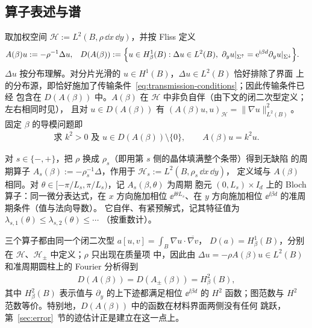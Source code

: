\subsection{算子表述与谱}

取加权空间 $\mathcal H:=L^2(B,\rho\,\dd x\,\dd y)$，并按 Fliss\cite[第~3~节]{Fliss2013}
定义
\begin{align}
  A(\beta)u&:=-\rho^{-1}\Delta u,
  &D(A(\beta))
  &:=\Bigl\{u\in H^1_\beta(B):\Delta u\in L^2(B),\
    \partial_yu|_{\Sigma^{\uparrow}}=\mathrm{e}^{\mathrm{i}\beta d}\partial_yu|_{\Sigma^{\downarrow}}
  \Bigr\}.
  \label{eq:fixed-beta-operator}
\end{align}
$\Delta u$ 按分布理解。对分片光滑的 $u\in H^1(B)$，$\Delta u\in L^2(B)$ 恰好排除了界面
上的分布源，即恰好施加了传输条件~\eqref{eq:transmission-conditions}；因此传输条件已经
包含在 $D(A(\beta))$ 中。$A(\beta)$ 在 $\mathcal H$ 中非负自伴（由下文的闭二次型定义；左右相同时见\cite[命题~3.1]{Fliss2013}），
且对 $u\in D(A(\beta))$ 有 $(A(\beta)u,u)_{\mathcal H}=\lVert\nabla u\rVert_{L^2(B)}^2$。
固定 $\beta$ 的导模问题即
\begin{align}
  \text{求 }k^2>0\text{ 及 }u\in D(A(\beta))\setminus\{0\},
  \qquad A(\beta)u=k^2u.
  \label{eq:beta-formulation}
\end{align}

对 $s\in\{-,+\}$，把 $\rho$ 换成 $\rho_s$（即用第 $s$ 侧的晶体填满整个条带）得到无缺陷
的周期算子 $A_s(\beta):=-\rho_s^{-1}\Delta$，作用于 $\mathcal H_s:=L^2(B,\rho_s\,\dd x\,\dd y)$，
定义域与 $A(\beta)$ 相同。对 $\theta\in[-\pi/L_s,\pi/L_s)$，记 $A_s(\beta,\theta)$ 为周期
胞元 $(0,L_s)\times I_d$ 上的 Bloch 算子：同一微分表达式，在 $x$ 方向施加相位
$\ee^{\ii\theta L_s}$、在 $y$ 方向施加相位 $\ee^{\ii\beta d}$ 的准周期条件（值与法向导数）。
它自伴、有紧预解式，记其特征值为 $\lambda_{s,1}(\theta)\leq\lambda_{s,2}(\theta)\leq\cdots$
（按重数计）。

三个算子都由同一个闭二次型 $a[u,v]=\int_B\nabla u\cdot\overline{\nabla v}$，
$D(a)=H^1_\beta(B)$，分别在 $\mathcal H$、$\mathcal H_\pm$ 中定义；$\rho$ 只出现在质量项
中，因此由 $\Delta u=-\rho A(\beta)u\in L^2(B)$ 和准周期圆柱上的 Fourier 分析得到
\begin{align}
  D(A(\beta))=D(A_\pm(\beta))=H^2_\beta(B),
  \label{eq:operator-domain-h2}
\end{align}
其中 $H^2_\beta(B)$ 表示值与 $\partial_y$ 的上下迹都满足相位 $\ee^{\ii\beta d}$ 的 $H^2$
函数；图范数与 $H^2$ 范数等价。特别地，$D(A(\beta))$ 中的函数在材料界面两侧没有任何
跳跃，第~\ref{sec:error}~节的迹估计正是建立在这一点上。

